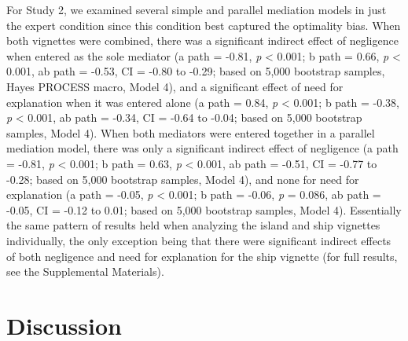 \documentclass[
  man, donotrepeattitle,floatsintext]{apa6}
\begin{document}
For Study 2, we examined several simple and parallel mediation models in just the expert condition since this condition best captured the optimality bias. When both vignettes were combined, there was a significant indirect effect of negligence when entered as the sole mediator (a path = -0.81, \emph{p} \textless{} 0.001; b path = 0.66, \emph{p} \textless{} 0.001, ab path = -0.53, CI = -0.80 to -0.29; based on 5,000 bootstrap samples, Hayes PROCESS macro, Model 4), and a significant effect of need for explanation when it was entered alone (a path = 0.84, \emph{p} \textless{} 0.001; b path = -0.38, \emph{p} \textless{} 0.001, ab path = -0.34, CI = -0.64 to -0.04; based on 5,000 bootstrap samples, Model 4). When both mediators were entered together in a parallel mediation model, there was only a significant indirect effect of negligence (a path = -0.81, \emph{p} \textless{} 0.001; b path = 0.63, \emph{p} \textless{} 0.001, ab path = -0.51, CI = -0.77 to -0.28; based on 5,000 bootstrap samples, Model 4), and none for need for explanation (a path = -0.05, \emph{p} \textless{} 0.001; b path = -0.06, \emph{p} = 0.086, ab path = -0.05, CI = -0.12 to 0.01; based on 5,000 bootstrap samples, Model 4). Essentially the same pattern of results held when analyzing the island and ship vignettes individually, the only exception being that there were significant indirect effects of both negligence and need for explanation for the ship vignette (for full results, see the Supplemental Materials).

\hypertarget{discussion}{%
\section{Discussion}\label{discussion}}
\end{document}
